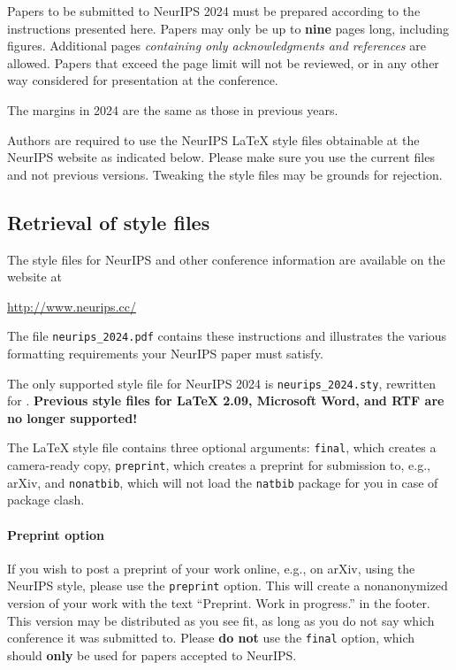 \documentclass{article}
\begin{document}
Papers to be submitted to NeurIPS 2024 must be prepared according to the
instructions presented here. Papers may only be up to {\bf nine} pages long,
including figures. Additional pages \emph{containing only acknowledgments and
references} are allowed. Papers that exceed the page limit will not be
reviewed, or in any other way considered for presentation at the conference.


The margins in 2024 are the same as those in previous years.


Authors are required to use the NeurIPS \LaTeX{} style files obtainable at the
NeurIPS website as indicated below. Please make sure you use the current files
and not previous versions. Tweaking the style files may be grounds for
rejection.


\subsection{Retrieval of style files}


The style files for NeurIPS and other conference information are available on
the website at
\begin{center}
  \url{http://www.neurips.cc/}
\end{center}
The file \verb+neurips_2024.pdf+ contains these instructions and illustrates the
various formatting requirements your NeurIPS paper must satisfy.


The only supported style file for NeurIPS 2024 is \verb+neurips_2024.sty+,
rewritten for \LaTeXe{}.  \textbf{Previous style files for \LaTeX{} 2.09,
  Microsoft Word, and RTF are no longer supported!}


The \LaTeX{} style file contains three optional arguments: \verb+final+, which
creates a camera-ready copy, \verb+preprint+, which creates a preprint for
submission to, e.g., arXiv, and \verb+nonatbib+, which will not load the
\verb+natbib+ package for you in case of package clash.


\paragraph{Preprint option}
If you wish to post a preprint of your work online, e.g., on arXiv, using the
NeurIPS style, please use the \verb+preprint+ option. This will create a
nonanonymized version of your work with the text ``Preprint. Work in progress.''
in the footer. This version may be distributed as you see fit, as long as you do not say which conference it was submitted to. Please \textbf{do
  not} use the \verb+final+ option, which should \textbf{only} be used for
papers accepted to NeurIPS.
\end{document}
